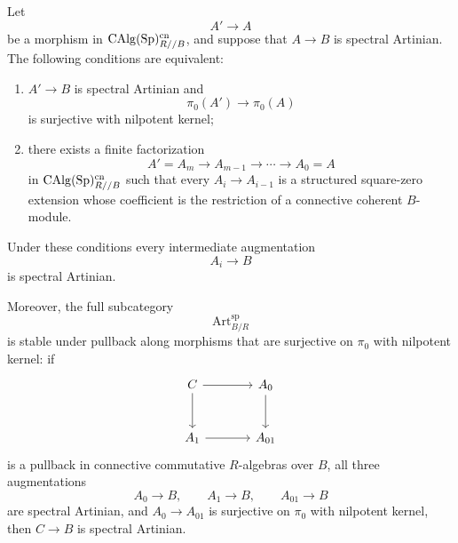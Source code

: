 \begin{proposition}
\label{prop:artinian-relative-pi0-surjective-factorization}
Let
\[
    A'\longrightarrow A
\]
be a morphism in
\(\operatorname{CAlg}(\operatorname{Sp})^{\mathrm{cn}}_{R//B}\), and suppose that
\(A\to B\) is spectral Artinian. The following conditions are equivalent:
\begin{enumerate}[label=(\roman*)]
    \item \(A'\to B\) is spectral Artinian and
    \[
        \pi_0(A')\longrightarrow\pi_0(A)
    \]
    is surjective with nilpotent kernel;

    \item there exists a finite factorization
    \[
        A'=A_m
        \longrightarrow
        A_{m-1}
        \longrightarrow
        \cdots
        \longrightarrow
        A_0=A
    \]
    in \(\operatorname{CAlg}(\operatorname{Sp})^{\mathrm{cn}}_{R//B}\) such that every
    \(A_i\to A_{i-1}\) is a structured square-zero extension whose coefficient
    is the restriction of a connective coherent \(B\)-module.
\end{enumerate}
Under these conditions every intermediate augmentation
\[
    A_i\longrightarrow B
\]
is spectral Artinian.

Moreover, the full subcategory
\[
    \operatorname{Art}^{\mathrm{sp}}_{B/R}
\]
is stable under pullback along morphisms that are surjective on \(\pi_0\) with nilpotent kernel: if
\[
\begin{tikzcd}[column sep=large,row sep=large]
    C \arrow[r] \arrow[d]
        & A_0 \arrow[d]
    \\
    A_1 \arrow[r]
        & A_{01}
\end{tikzcd}
\]
is a pullback in connective commutative \(R\)-algebras over \(B\), all three
augmentations
\[
    A_0\to B,\qquad A_1\to B,\qquad A_{01}\to B
\]
are spectral Artinian, and \(A_0\to A_{01}\) is surjective on \(\pi_0\) with nilpotent kernel, then
\(C\to B\) is spectral Artinian.
\end{proposition}

